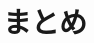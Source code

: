\documentclass[titlepage]{jarticle}
\begin{document}
%
%
%
%
\section{まとめ}
%



%
%
%

%
%
%
%

%
%


%
%
%
%
%
%
%
\end{document}
